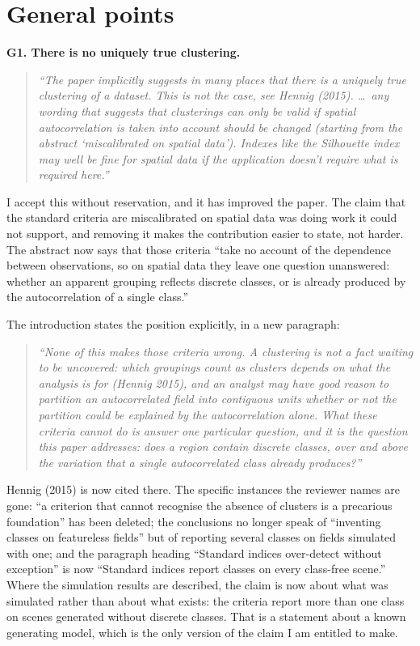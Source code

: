 \documentclass[11pt]{article}
\newcommand{\R}[1]{\medskip\noindent\textbf{#1}\quad}
\newenvironment{rquote}{\begin{quote}\itshape}{\end{quote}}
\begin{document}
\section*{General points}

\R{G1. There is no uniquely true clustering.}
\begin{rquote}
``The paper implicitly suggests in many places that there is a uniquely true
clustering of a dataset. This is not the case, see Hennig (2015). \dots\ any
wording that suggests that clusterings can only be valid if spatial
autocorrelation is taken into account should be changed (starting from the
abstract `miscalibrated on spatial data'). Indexes like the Silhouette index
may well be fine for spatial data if the application doesn't require what is
required here.''
\end{rquote}
I accept this without reservation, and it has improved the paper. The claim
that the standard criteria are miscalibrated on spatial data was doing work it
could not support, and removing it makes the contribution easier to state, not
harder. The abstract now says that those criteria ``take no account of the
dependence between observations, so on spatial data they leave one question
unanswered: whether an apparent grouping reflects discrete classes, or is
already produced by the autocorrelation of a single class.''

The introduction states the position explicitly, in a new paragraph:
\begin{rquote}
``None of this makes those criteria wrong. A clustering is not a fact waiting
to be uncovered: which groupings count as clusters depends on what the analysis
is for (Hennig 2015), and an analyst may have good reason to partition an
autocorrelated field into contiguous units whether or not the partition could
be explained by the autocorrelation alone. What these criteria cannot do is
answer one particular question, and it is the question this paper addresses:
does a region contain discrete classes, over and above the variation that a
single autocorrelated class already produces?''
\end{rquote}
Hennig (2015) is now cited there. The specific instances the reviewer names are
gone: ``a criterion that cannot recognise the absence of clusters is a
precarious foundation'' has been deleted; the conclusions no longer speak of
``inventing classes on featureless fields'' but of reporting several classes on
fields simulated with one; and the paragraph heading ``Standard indices
over-detect without exception'' is now ``Standard indices report classes on
every class-free scene.'' Where the simulation results are described, the claim
is now about what was simulated rather than about what exists: the criteria
report more than one class on scenes generated without discrete classes. That
is a statement about a known generating model, which is the only version of the
claim I am entitled to make.
\end{document}
